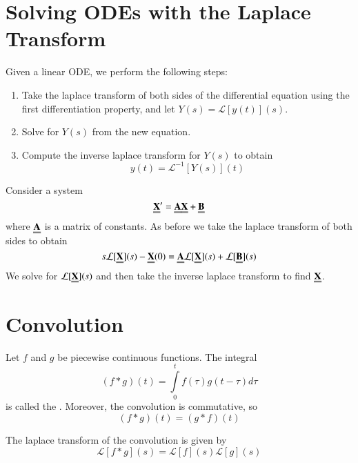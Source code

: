 
\section{Solving ODEs with the Laplace Transform}

\begin{definition}
        Given a linear ODE, we perform the following steps:
        \begin{enumerate}
                \item Take the laplace transform of both sides of the differential equation using the first differentiation property, and let $Y(s) = \mathcal{L}[y(t)](s)$.
                \item Solve for $Y(s)$ from the new equation.
                \item Compute the inverse laplace transform for $Y(s)$ to obtain \begin{equation}
                                y(t) = \mathcal{L}^{-1}[Y(s)](t)
                \end{equation}
        \end{enumerate}
\end{definition}



\begin{definition}
        Consider a system \begin{equation}
                \Emph{X}' = \Emph{A}\Emph{X}+\Emph{B}
        \end{equation}
        where $\Emph{A}$ is a matrix of constants. As before we take the laplace transform of both sides to obtain \begin{equation}
                s\mathcal{L}[\Emph{X}](s)-\Emph{X}(0) = \Emph{A}\mathcal{L}[\Emph{X}](s) + \mathcal{L}[\Emph{B}](s)
        \end{equation}
        We solve for $\mathcal{L}[\Emph{X}](s)$ and then take the inverse laplace transform to find $\Emph{X}$.
\end{definition}




\section{Convolution}

\begin{definition}[Convolution]
        Let $f$ and $g$ be piecewise continuous functions. The integral \begin{equation}
                (f*g)(t) = \int\limits_0^tf(\tau)g(t-\tau)d\tau
        \end{equation}
        is called the . Moreover, the convolution is commutative, so \begin{equation}
                (f*g)(t) = (g*f)(t)
        \end{equation}
\end{definition}




\begin{props}
        The laplace transform of the convolution is given by \begin{equation}
                \mathcal{L}[f*g](s) = \mathcal{L}[f](s)\mathcal{L}[g](s)
        \end{equation}
\end{props}





